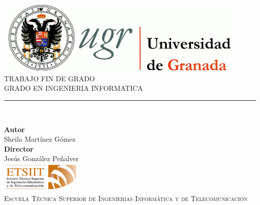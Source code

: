 \begin{titlepage}
\newlength{\centeroffset}
\setlength{\centeroffset}{-0.5\oddsidemargin}
\addtolength{\centeroffset}{0.5\evensidemargin}
\thispagestyle{empty}

\noindent\hspace*{\centeroffset}\begin{minipage}{\textwidth}

\centering
\includegraphics[width=0.9\textwidth]{logos/logo_ugr.jpg}\\[1.4cm]

\textsc{ \Large TRABAJO FIN DE GRADO\\[0.2cm]}
\textsc{ GRADO EN INGENIERIA INFORMATICA}\\[1cm]

\noindent\rule[-1ex]{\textwidth}{1pt}\\[3.5ex]

\end{minipage}

\vspace{2.5cm}
\noindent\hspace*{\centeroffset}
\begin{minipage}{\textwidth}
\centering

\textbf{Autor}\\ {Sheila Martínez Gómez}\\[2.5ex]
\textbf{Director}\\ {Jesús González Peñalver}\\[2cm]
\includegraphics[width=0.3\textwidth]{logos/etsiit_logo.png}\\[0.1cm]
\textsc{Escuela Técnica Superior de Ingenierías Informática y de Telecomunicación}\\

\end{minipage}
\end{titlepage}
